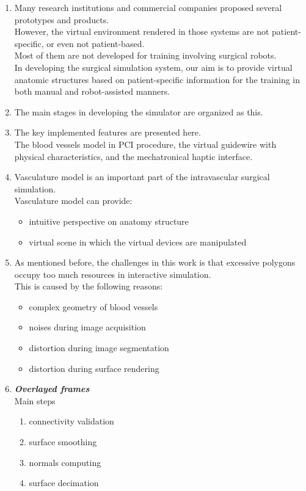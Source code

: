 \documentclass{article}
\begin{document}
\begin{enumerate}
\item Many research institutions and commercial companies proposed several prototypes and products.\\
      However, the virtual environment rendered in those systems are not patient-specific, or even not patient-based.\\
      Most of them are not developed for training involving surgical robots.\\
      In developing the surgical simulation system, our aim is to provide virtual anatomic structures based on patient-specific information for the training in both manual and robot-assisted manners. %

\item The main stages in developing the simulator are organized as this.

\item The key implemented features are presented here. \\
      The blood vessels model in PCI procedure, the virtual guidewire with physical characteristics, and the mechatronical haptic interface. 
	  
\item Vasculature model is an important part of the intravascular surgical simulation.\\
      Vasculature model can provide:
      \begin{itemize}
      \item intuitive perspective on anatomy structure
      \item virtual scene in which the virtual devices are manipulated
      \end{itemize}

\item As mentioned before, the challenges in this work is that excessive polygons occupy too much resources in interactive simulation. \\
      This is caused by the following reasons: 
	  \begin{itemize}
      \item complex geometry of blood vessels
      \item noises during image acquisition
      \item distortion during image segmentation
      \item distortion during surface rendering
      \end{itemize}

\item \textbf{\emph{Overlayed frames}}\\
      {Main steps}
      \begin{enumerate}
      \item connectivity validation
      \item surface smoothing
      \item normals computing
      \item surface decimation
      \end{enumerate}


\end{enumerate}
\end{document}
